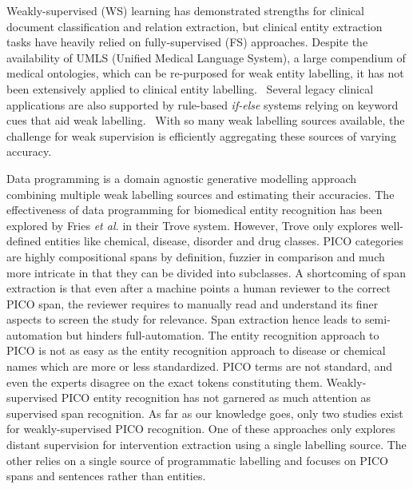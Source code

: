 \documentclass[10.7pt,]{article}
\begin{document}
Weakly-supervised (WS) learning has demonstrated strengths for clinical document classification and relation extraction, but clinical entity extraction tasks have heavily relied on fully-supervised (FS) approaches.\cite{meng2018weakly,wang2019clinical,mintz2009distant,elangovan2020assigning,weber2020pedl,mallory2020extracting}
Despite the availability of UMLS (Unified Medical Language System), a large compendium of medical ontologies, which can be re-purposed for weak entity labelling, it has not been extensively applied to clinical entity labelling.~\cite{humphreys1998unified}
Several legacy clinical applications are also supported by rule-based \textit{if-else} systems relying on keyword cues that aid weak labelling.~\cite{friedlin2008software,kim2017extracting,yang2015automatic}
With so many weak labelling sources available, the challenge for weak supervision is efficiently aggregating these sources of varying accuracy.


Data programming is a domain agnostic generative modelling approach combining multiple weak labelling sources and estimating their accuracies.
The effectiveness of data programming for biomedical entity recognition has been explored by Fries \textit{et al.} in their Trove system.
However, Trove only explores well-defined entities like chemical, disease, disorder and drug classes.\cite{fries2021ontology}
PICO categories are highly compositional spans by definition, fuzzier in comparison and much more intricate in that they can be divided into subclasses.
A shortcoming of span extraction is that even after a machine points a human reviewer to the correct PICO span, the reviewer requires to manually read and understand its finer aspects to screen the study for relevance.
Span extraction hence leads to semi-automation but hinders full-automation.
The entity recognition approach to PICO is not as easy as the entity recognition approach to disease or chemical names which are more or less standardized.
PICO terms are not standard, and even the experts disagree on the exact tokens constituting them.\cite{brockmeier2019improving}
Weakly-supervised PICO entity recognition has not garnered as much attention as supervised span recognition.
As far as our knowledge goes, only two studies exist for weakly-supervised PICO recognition.
One of these approaches only explores distant supervision for intervention extraction using a single labelling source.\cite{dhrangadhariya2022distant}
The other relies on a single source of programmatic labelling and focuses on PICO spans and sentences rather than entities.\cite{liu2021sent2span}
\end{document}
